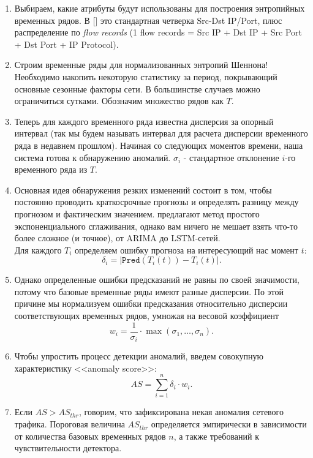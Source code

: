 \documentclass[]{interact}
\theoremstyle{plain}%
\theoremstyle{definition}
\theoremstyle{remark}
\begin{document}
\begin{enumerate}
    \item Выбираем, какие атрибуты будут использованы для построения энтропийных временных рядов. В [\cite{Win11}] это стандартная четверка Src-Dst IP/Port, плюс распределение по \textit{flow records} (1 flow records = Src IP + Dst IP + Src Port + Dst Port + IP Protocol).
    \item Строим временные ряды для нормализованных энтропий Шеннона! Необходимо накопить некоторую статистику за период, покрывающий основные сезонные факторы сети. В большинстве случаев можно ограничиться сутками. Обозначим множество рядов как $T$.
    \item Теперь для каждого временного ряда известна дисперсия за опорный интервал (так мы будем называть интервал для расчета дисперсии временного ряда в недавнем прошлом). Начиная со следующих моментов времени, наша система готова к обнаружению аномалий. $\sigma_i$ - стандартное отклонение $i$-го временного ряда из $T$.
    \item Основная идея обнаружения резких изменений состоит в том, чтобы постоянно проводить краткосрочные прогнозы и определять разницу между прогнозом и фактическим значением. \cite{Win11} предлагают метод простого экспоненциального сглаживания, однако вам ничего не мешает взять что-то более сложное (и точное), от ARIMA до LSTM-сетей. \\
    Для каждого $T_i$ определяем ошибку прогноза на интересующий нас момент $t$:
    \begin{equation}
        \delta_i = | \texttt{Pred}(T_i(t)) - T_i(t) |.
    \end{equation}
    \item Однако определенные ошибки предсказаний не равны по своей значимости, потому что базовые временные ряды имеют разные дисперсии. По этой причине мы нормализуем ошибки предсказания относительно дисперсии соответствующих временных рядов, умножая на весовой коэффициент
    \begin{equation}
        w_i = \frac{1}{\sigma_i} \cdot \max (\sigma_1, \ldots, \sigma_n).
    \end{equation}
    \item Чтобы упростить процесс детекции аномалий, введем совокупную характеристику <<anomaly score>>:
    \begin{equation}
        AS = \sum_{i=1}^n \delta_i \cdot w_i.
    \end{equation}
    \item Если $AS > AS_{thr}$, говорим, что зафиксирована некая аномалия сетевого трафика. Пороговая величина $AS_{thr}$ определяется эмпирически в зависимости от количества базовых временных рядов $n$, а также требований к чувствительности детектора.

\end{enumerate}
\end{document}
